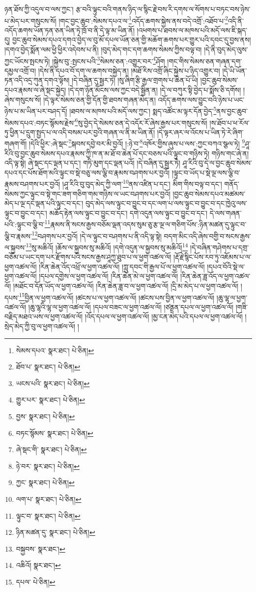 ཉན་ཐོས་ཀྱི་འདུལ་བ་ལས་ཀྱང་། རྩ་བའི་ལྟུང་བའི་གནས་ཉིད་ལ་སྙིང་རྗེ་བས་རི་དགས་ལ་སོགས་པ་བཏང་བས་ཉེས་པ་མེད་པར་གསུངས་སོ། །གང་བྱང་ཆུབ་:སེམས་དཔའ་ལ་\footnote{སེམས་དཔའ་  སྣར་ཐང་།  པེ་ཅིན། }འདོད་ཆགས་སྐྱེས་ནས་བདེ་འགྲོ་:འཐོབ་པ་\footnote{ཐོབ་པ་  སྣར་ཐང་།  པེ་ཅིན། }འདི་ནི་འདོད་ཆགས་ཡོན་ཏན་ཅན་ཡིན་ཏེ་ཁྲོ་བ་ནི་དེ་ལྟ་མ་ཡིན་ནོ། །འཕགས་པ་ཐབས་ལ་མཁས་པའི་མདོ་ལས་ཇི་སྐད་དུ། བྱང་ཆུབ་སེམས་དཔའ་དགའ་བྱེད་ལ་བུ་མོ་དཔལ་ཡོན་ཅན་གྱི་མཆོག་ཆགས་པར་གྱུར་པའི་དབང་དུ་བྱས་ནས། །དགའ་བྱེད་སྨོན་ལམ་ཕྱི་ཕྱིར་འདེབས་པ་ནི། །བུད་མེད་གང་དག་ཆགས་སེམས་ཀྱིས་བལྟ་བ། །དེ་ནི་བུད་མེད་ལུས་ཀྱང་ཡོངས་སྤངས་ཏེ། །སྐྱེས་བུ་:སྤངས་པའི་\footnote{ཡངས་པའི་  སྣར་ཐང་།  པེ་ཅིན། }སེམས་ཅན་:འགྱུར་བར་\footnote{གྱུར་པར་  སྣར་ཐང་།  པེ་ཅིན། }ཤོག །གང་གིས་སེམས་ཅན་གཞན་དག་དམྱལ་འགྲོ་བ། །དེས་ནི་དཔའ་བོ་དག་ལ་ཆགས་བསྐྱེད་ན། །མཐོ་རིས་འགྲོ་ཞིང་སྐྱེས་པ་ཉིད་འགྱུར་བ། །དེ་ཡི་ཡོན་ཏན་འདི་འདྲ་ཀུན་དགའ་ལྟོས། །དེ་བཞིན་དུ་སྦྱར་ཏེ། །སུ་ཞིག་རྩི་རྒྱལ་གྲགས་པ་ཆེན་པོ་ཡི། །བྱང་ཆུབ་སེམས་དཔའ་རྣམས་ལ་ཞེ་སྡང་སྐྱེད། །དེ་དག་ཉོན་མོངས་ལས་ཀྱང་བདེ་སྦྱིན་ན། །དེ་ལ་བཀུར་སྟི་བྱེད་པ་སྨོས་ཅི་དགོས། །ཞེས་གསུངས་སོ། །དེ་ལྟར་སེམས་ཅན་གྱི་དོན་གྱི་ཐབས་གཞན་མེད་ན། འདོད་ཆགས་ལས་བྱུང་བའི་ཉེས་པ་ཡང་ཉེས་པ་མ་ཡིན་པར་བཤད་དོ། །ཐབས་ལ་མཁས་པའི་མདོ་ལས་ཀྱང་། སྨད་འཚོང་མ་ལྟར་དོན་བྱེད་\footnote{བྱས་  སྣར་ཐང་།  པེ་ཅིན། }ནས་བྱང་ཆུབ་སེམས་དཔའ་:བཏང་སྙོམས་རྗེས་\footnote{བཏང་སྙོམས་  སྣར་ཐང་།  པེ་ཅིན། }སུ་བྱེད་དེ་སེམས་ཅན་དེ་འདོར་རོ་ཞེས་རྒྱས་པར་གསུངས་སོ། །ས་ཐོབ་པ་ཕ་རོལ་ཏུ་ཕྱིན་པ་དྲུག་སྤྱད་པ་ལ་འདི་བསམ་པར་བྱའི་གཞན་ལ་ནི་མ་ཡིན་ནོ། །དེ་ལྟར་ཞར་ལ་འོངས་པ་ཡིན་ཏེ་རེ་ཞིག་གཞག་གོ། །དེའི་ཕྱིར་:ཞེ་སྡང་\footnote{ཞེ་སྡང་གི་  སྣར་ཐང་།  པེ་ཅིན། }སྐབས་དབྱེ་བར་མི་བྱའོ། །:ཉེ་བ་\footnote{ཉེ་བར་  སྣར་ཐང་།  པེ་ཅིན། }འཁོར་གྱིས་ཞུས་པ་ལས་:ཀྱང་བཀའ་སྩལ་ཏེ། \footnote{ཀྱང་  སྣར་ཐང་།  པེ་ཅིན། }ཤཱ་རིའི་བུ་བྱང་ཆུབ་སེམས་དཔའ་རྣམས་ཀྱི་ཁ་ན་མ་ཐོ་བ་ཆེན་པོ་དང་བཅས་པའི་ལྟུང་བ་གཉིས་ཏེ། གཉིས་གང་ཞེ་ན། འདི་ལྟ་སྟེ། ཞེ་སྡང་དང་ལྡན་པ་དང་། གཏི་མུག་དང་ལྡན་པའོ། །དེ་བཞིན་དུ་སྦྱར་ཏེ། ཤཱ་རིའི་བུ་དེ་ལ་བྱང་ཆུབ་སེམས་དཔའ་དང་པོས་ཐོག་མའི་ལྟུང་བ་སྡེ་བཅུ་ལས་ལྕི་བ་རྣམས་བཤགས་པར་བྱའོ། །ལྟུང་བ་ཡོད་པ་སྡེ་ལྔ་ལས་ལྕི་བ་རྣམས་བཤགས་པར་བྱའོ། །ཤཱ་རིའི་བུ་བུད་མེད་ཀྱི་ལག་\footnote{ལག་པ་  སྣར་ཐང་།  པེ་ཅིན། }ནས་འཛིན་པ་དང་། མིག་གིས་བལྟ་བ་དང་། གནོད་སེམས་ཀྱང་ལྟུང་བ་སྟེ་གང་ཟག་གཅིག་གམ་གཉིས་ལ་ཡང་བཤགས་པར་བྱའོ། །བྱང་ཆུབ་སེམས་དཔའ་མཚམས་མེད་པ་ལྔ་དང་ལྡན་པའི་ལྟུང་བ་དང་། བུད་མེད་ལས་ལྟུང་བ་བྱུང་བ་དང་ལག་པ་ལས་ལྟུང་བ་བྱུང་བ་དང་ཁྱེའུ་ལས་ལྟུང་བ་བྱུང་བ་དང་། མཆོད་རྟེན་ལས་ལྟུང་བ་བྱུང་བ་དང་། དགེ་འདུན་ལས་ལྟུང་བ་བྱུང་བ་དང་། དེ་ལས་གཞན་པའི་:ལྟུང་བ་ལྕི་བ་\footnote{ལྟུང་བ་  སྣར་ཐང་།  པེ་ཅིན། }རྣམས་ནི་སངས་རྒྱས་བཅོམ་ལྡན་འདས་སུམ་ཅུ་རྩ་ལྔ་ལ་གཅིག་པོས་:ཉིན་མཚན་དུ་ལྟུང་བ་ལྕི་བ་རྣམས་\footnote{ཉིན་མཚན་དུ་  སྣར་ཐང་།  པེ་ཅིན། }བཤགས་པར་བྱའོ། །དེ་ལ་ལྟུང་བ་བཤགས་པ་ནི་འདི་ལྟ་སྟེ། བདག་མིང་འདི་ཞེས་བགྱི་བ་སངས་རྒྱས་ལ་སྐྱབས་\footnote{བསྐྱབས་  སྣར་ཐང་། }སུ་མཆིའོ། །ཆོས་ལ་སྐྱབས་སུ་མཆིའོ། །དགེ་འདུན་ལ་སྐྱབས་སུ་མཆིའོ།\footnote{འཆིའོ།  སྣར་ཐང་། } །དེ་བཞིན་གཤེགས་པ་དགྲ་བཅོམ་པ་ཡང་དག་པར་རྫོགས་པའི་སངས་རྒྱས་ཤཱཀྱ་ཐུབ་པ་ལ་ཕྱག་འཚལ་ལོ། །རྡོ་རྗེ་སྙིང་པོས་རབ་ཏུ་འཇོམས་པ་ལ་ཕྱག་འཚལ་ལོ། །རིན་ཆེན་འོད་འཕྲོ་ལ་ཕྱག་འཚལ་ལོ། །ཀླུ་དབང་གི་རྒྱལ་པོ་ལ་ཕྱག་འཚལ་ལོ། །དཔའ་བོའི་སྡེ་ལ་ཕྱག་འཚལ་ལོ། །དཔལ་དགྱེས་ལ་ཕྱག་འཚལ་ལོ། །རིན་ཆེན་མེ་ལ་ཕྱག་འཚལ་ལོ། །རིན་ཆེན་ཟླ་འོད་ལ་ཕྱག་འཚལ་ལོ། །མཐོང་བ་དོན་ཡོད་ལ་ཕྱག་འཚལ་ལོ། །རིན་ཆེན་ཟླ་བ་ལ་ཕྱག་འཚལ་ལོ། །དྲི་མ་མེད་པ་ལ་ཕྱག་འཚལ་ལོ། །དཔས་\footnote{དཔལ་  པེ་ཅིན། }བྱིན་ལ་ཕྱག་འཚལ་ལོ། །ཚངས་པ་ལ་ཕྱག་འཚལ་ལོ། །ཚངས་པས་བྱིན་ལ་ཕྱག་འཚལ་ལོ། །ཆུ་ལྷ་ལ་ཕྱག་འཚལ་ལོ། །ཆུ་ལྷའི་ལྷ་ལ་ཕྱག་འཚལ་ལོ། །དཔལ་བཟང་ལ་ཕྱག་འཚལ་ལོ། །ཙནྡན་དཔལ་ལ་ཕྱག་འཚལ་ལོ། །གཟི་བརྗིད་མཐའ་ཡས་ལ་ཕྱག་འཚལ་ལོ། །འོད་དཔལ་ལ་ཕྱག་འཚལ་ལོ། །མྱ་ངན་མེད་པའི་དཔལ་ལ་ཕྱག་འཚལ་ལོ། །སྲེད་མེད་ཀྱི་བུ་ལ་ཕྱག་འཚལ་ལོ། །
